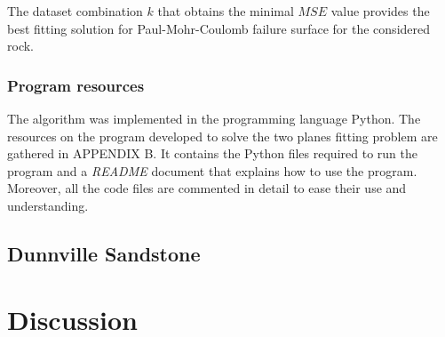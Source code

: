 The dataset combination $k$ that obtains the minimal $MSE$ value provides the best fitting solution for Paul-Mohr-Coulomb failure surface for the considered rock. 

\subsubsection{Program resources}

The algorithm was implemented in the programming language Python. The resources on the program developed to solve the two planes fitting problem are gathered in APPENDIX B. It contains the Python files required to run the program and a \emph{README} document that explains how to use the program. Moreover, all the code files are commented in detail to ease their use and understanding.  

\subsection{Dunnville Sandstone}


\section{Discussion}